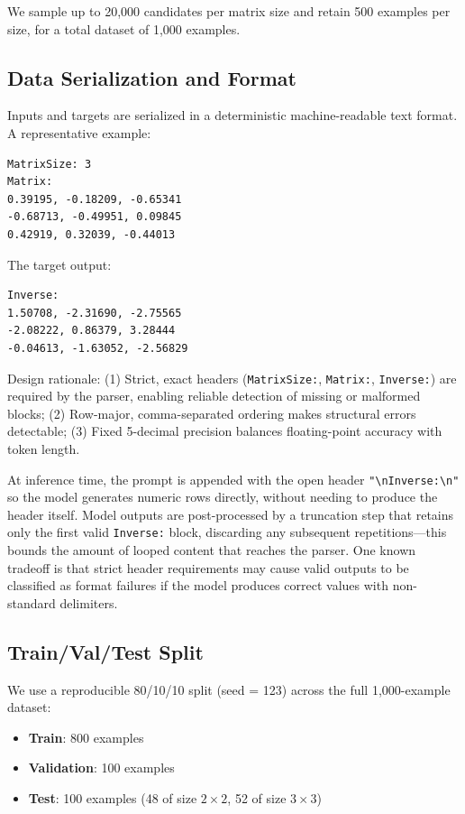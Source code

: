 We sample up to 20{,}000 candidates per matrix size and retain 500 examples per size, for a total dataset of 1{,}000 examples.

\subsection{Data Serialization and Format}

Inputs and targets are serialized in a deterministic machine-readable text format. A representative example:

\begin{verbatim}
MatrixSize: 3
Matrix:
0.39195, -0.18209, -0.65341
-0.68713, -0.49951, 0.09845
0.42919, 0.32039, -0.44013
\end{verbatim}

\noindent The target output:
\begin{verbatim}
Inverse:
1.50708, -2.31690, -2.75565
-2.08222, 0.86379, 3.28444
-0.04613, -1.63052, -2.56829
\end{verbatim}

\noindent Design rationale: (1) Strict, exact headers (\texttt{MatrixSize:}, \texttt{Matrix:}, \texttt{Inverse:}) are required by the parser, enabling reliable detection of missing or malformed blocks; (2) Row-major, comma-separated ordering makes structural errors detectable; (3) Fixed 5-decimal precision balances floating-point accuracy with token length.

At inference time, the prompt is appended with the open header \verb|"\nInverse:\n"| so the model generates numeric rows directly, without needing to produce the header itself. Model outputs are post-processed by a truncation step that retains only the first valid \texttt{Inverse:} block, discarding any subsequent repetitions---this bounds the amount of looped content that reaches the parser. One known tradeoff is that strict header requirements may cause valid outputs to be classified as format failures if the model produces correct values with non-standard delimiters.

\subsection{Train/Val/Test Split}

We use a reproducible 80/10/10 split (seed = 123) across the full 1{,}000-example dataset:
\begin{itemize}
    \item \textbf{Train}: 800 examples
    \item \textbf{Validation}: 100 examples
    \item \textbf{Test}: 100 examples (48 of size $2 \times 2$, 52 of size $3 \times 3$)
\end{itemize}

